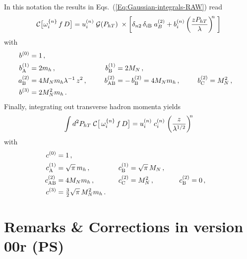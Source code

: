 \documentclass[a4paper,11pt]{article}
\newcommand{\be}{\begin{equation}}
\newcommand{\ee}{\end{equation}}
\def\Phperp{P_{hT}}
\newcommand*{\BibPath}{.}%
\begin{document}
In this notation the results in Eqs.~(\ref{Eq:Gaussian-integrals-RAW}) 
read 
\be
	{\cal C}\bigl[ \omega^{\{n\}}_{i} \, f \, D \bigr]
	= u^{(n)}_{i} \;{\cal G}(\Phperp)\;\times
	\left[
	\delta_{n2}\,\delta_{i\rm B}\;a^{(2)}_{B} + b^{(n)}_{i} 
	\left(\frac{z\Phperp}{\lambda}\right)^{\!\!n}\;\right]
\ee
with
\begin{alignat}{7}
	b^{(0)}_{\rm  } 	&= 1 \, , \\
	b^{(1)}_{\rm A} 	&= 2m_h	\, , &
	b^{(1)}_{\rm B} 	&= 2M_N	\, , \\
	a^{(2)}_{\rm B}	&= 4M_Nm_h\lambda^{-1}\,z^2  \, , \;\;\;\;\;\; & 
	b^{(2)}_{\rm AB} 	&= -\,b^{(2)}_{\rm B}
			 = 4M_Nm_h 	\, , \;\;\;\;\;\; & 
	b^{(2)}_{\rm C} 	&= M_N^2  \, ,\\
	b^{(3)}_{\rm  } 	&= 2M_N^2m_h \, .
	\label{Eq:Gaussian-integrals-working-III}
\end{alignat}
Finally, integrating out transverse hadron momenta yields
\be
	\int d^2\Phperp\;
	{\cal C}\bigl[\,\omega^{\{n\}}_{i} \, f \, D \bigr] 
	= u^{(n)}_{i} \;c^{(n)}_{i}\;\biggl(\frac{z}{\lambda^{1/2}}\biggr)^{\!\!n}
\ee
with
\begin{alignat}{7}
	c^{(0)}_{\rm  } 	&= 1 \, , \\
	c^{(1)}_{\rm A} 	&= \sqrt{\pi}\,m_h	\, , &
	c^{(1)}_{\rm B} 	&= \sqrt{\pi}\,M_N	\, , \\
	c^{(2)}_{\rm AB} 	&= 4M_Nm_h		\, , \;\;\;\;\;\; & 
	c^{(2)}_{\rm C} 	&= M_N^2 		\, , \;\;\;\;\;\;\;\;\;\; & 
	c^{(2)}_{\rm B}	&= 0 			\, ,\\
	c^{(3)}_{\rm  } 	&= {\textstyle\frac32}\sqrt{\pi} \,M_N^2m_h 
	\, . \;\;\;     &
			&
	\label{Eq:Gaussian-integrals-working-III}
\end{alignat}

 

\newpage
\section*{Remarks  \& Corrections in version 00r (PS) {}}
\end{document}
